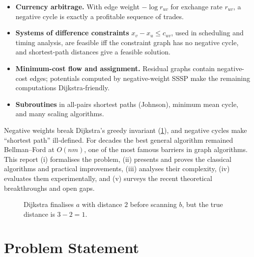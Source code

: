 \documentclass[11pt,a4paper]{article}
\theoremstyle{definition}
\begin{document}
\begin{itemize}
\item \textbf{Currency arbitrage.} With edge weight $-\log r_{uv}$ for exchange rate $r_{uv}$, a negative cycle is exactly a profitable sequence of trades.
\item \textbf{Systems of difference constraints} $x_v - x_u \le c_{uv}$, used in scheduling and timing analysis, are feasible iff the constraint graph has no negative cycle, and shortest-path distances give a feasible solution.
\item \textbf{Minimum-cost flow and assignment.} Residual graphs contain negative-cost edges; potentials computed by negative-weight SSSP make the remaining computations Dijkstra-friendly.
\item \textbf{Subroutines} in all-pairs shortest paths (Johnson), minimum mean cycle, and many scaling algorithms.
\end{itemize}

Negative weights break Dijkstra's greedy invariant (\cref{fig:dijkstra}), and negative cycles make ``shortest path'' ill-defined. For decades the best general algorithm remained Bellman--Ford at $O(nm)$, one of the most famous barriers in graph algorithms. This report (i) formalises the problem, (ii) presents and proves the classical algorithms and practical improvements, (iii) analyses their complexity, (iv) evaluates them experimentally, and (v) surveys the recent theoretical breakthroughs and open gaps.

\begin{figure}[H]
\centering
{}
\caption{Dijkstra finalises $a$ with distance $2$ before scanning $b$, but the true distance is $3-2=1$.}
\label{fig:dijkstra}
\end{figure}

\section{Problem Statement}
\end{document}
